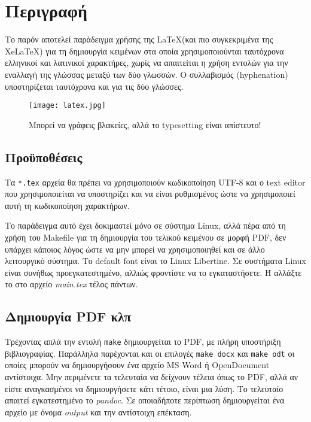 \section{Περιγραφή}

Το παρόν αποτελεί παράδειγμα χρήσης της \LaTeX (και πιο συγκεκριμένα της
XeLaTeX) για τη δημιουργία κειμένων στα οποία χρησιμοποιούνται
ταυτόχρονα ελληνικοί και λατινικοί χαρακτήρες, χωρίς να απαιτείται η
χρήση εντολών για την εναλλαγή της γλώσσας μεταξύ των δύο γλωσσών. Ο
συλλαβισμός (hyphenation) υποστηρίζεται ταυτόχρονα και για τις δύο
γλώσσες.

\begin{figure}
\centering
\texttt{[image: latex.jpg]}
\caption{Μπορεί να γράφεις βλακείες, αλλά το typesetting είναι απίστευτο!}
\label{fig:latex}
\end{figure}

\subsection{Προϋποθέσεις}

Τα \verb|*.tex| αρχεία θα πρέπει να χρησιμοποιούν κωδικοποίηση UTF-8 και
ο text editor που χρησιμοποιείται να υποστηρίζει και να είναι
ρυθμισμένος ώστε να χρησιμοποιεί αυτή τη κωδικοποίηση χαρακτήρων.

Το παράδειγμα αυτό έχει δοκιμαστεί μόνο σε σύστημα Linux, αλλά πέρα από
τη χρήση του Makefile για τη δημιουργία του τελικού κειμένου σε μορφή
PDF, δεν υπάρχει κάποιος λόγος ώστε να μην μπορεί να χρησιμοποιηθεί και
σε άλλο λειτουργικό σύστημα. Το default font είναι το Linux Libertine.
Σε συστήματα Linux είναι συνήθως προεγκατεστημένο, αλλιώς φροντίστε να
το εγκαταστήσετε. Ή αλλάξτε το στο αρχείο \emph{main.tex} τέλος πάντων.

\subsection{Δημιουργία PDF κλπ}

Τρέχοντας απλά την εντολή \verb|make| δημιουργείται το PDF, με πλήρη
υποστήριξη βιβλιογραφίας. Παράλληλα παρέχονται και οι επιλογές
\verb|make docx| και \verb|make odt| οι οποίες μπορούν να δημιουργήσουν
ένα αρχείο MS Word ή OpenDocument αντίστοιχα. Μην περιμένετε τα
τελευταία να δείχνουν τέλεια όπως το PDF, αλλά αν είστε αναγκασμένοι να
δημιουργήσετε κάτι τέτοιο, είναι μια λύση. Το τελευταίο απαιτεί
εγκατεστημένο το \emph{pandoc}. Σε οποιαδήποτε περίπτωση δημιουργείται
ένα αρχείο με όνομα \emph{output} και την αντίστοιχη επέκταση.


